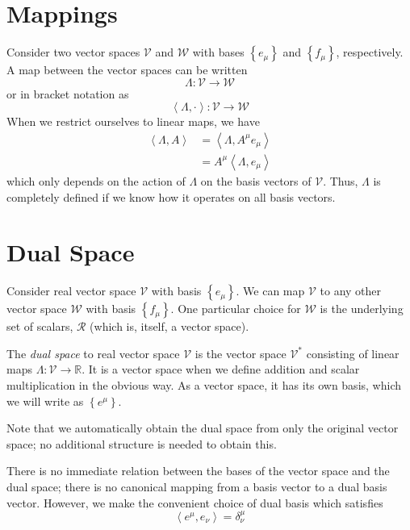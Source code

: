 \section{Mappings}
Consider two vector spaces $\mathcal{V}$ and $\mathcal{W}$ with bases $\left\{ e_{\mu} \right\}$ and $\left\{ f_{\mu} \right\}$, respectively. A map between the vector spaces can be written \[ \Lambda: \mathcal{V} \rightarrow \mathcal{W} \] or in bracket notation as \[ \left\langle \Lambda, \cdot \right\rangle : \mathcal{V} \rightarrow \mathcal{W} \] When we restrict ourselves to linear maps, we have 
\begin{align*}
	\left\langle \Lambda, A\right\rangle & = \left\langle \Lambda, A^{\mu} e_{\mu} \right\rangle \\
	& = A^{\mu} \left\langle \Lambda, e_{\mu} \right\rangle 
\end{align*}
which only depends on the action of $\Lambda$ on the basis vectors of $\mathcal{V}$. Thus, $\Lambda$ is completely defined if we know how it operates on all basis vectors.


\section{Dual Space}
Consider real vector space $\mathcal{V}$ with basis $\left\{ e_{\mu}\right\}$. We can map $\mathcal{V}$ to any other vector space $\mathcal{W}$ with basis $\left\{ f_{\mu}\right\}$. One particular choice for $\mathcal{W}$ is the underlying set of scalars, $\mathcal{R}$ (which is, itself, a vector space).

The \textit{dual space} to real vector space $\mathcal{V}$ is the vector space $\mathcal{V}^*$ consisting of linear maps $\Lambda: \mathcal{V}\rightarrow \mathbb{R}$. It is a vector space when we define addition and scalar multiplication in the obvious way. As a vector space, it has its own basis, which we will write as $\left\{ e^{\mu}\right\}$.

Note that we automatically obtain the dual space from only the original vector space; no additional structure is needed to obtain this.

There is no immediate relation between the bases of the vector space and the dual space; there is no canonical mapping from a basis vector to a dual basis vector. However, we make the convenient choice of dual basis which satisfies \[ \left\langle e^{\mu}, e_{\nu} \right\rangle = \delta_{\nu}^{\mu} \]

